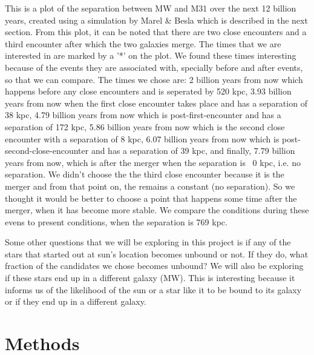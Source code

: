 \documentclass[iop]{emulateapj}
\begin{document}
    This is a plot of the separation between MW and M31 over the next 12 billion years, created using a simulation by Marel & Besla \cite{marel} which is described in the next section. From this plot, it can be noted that there are two close encounters and a third encounter after which the two galaxies merge. The times that we are interested in are marked by a '*' on the plot. We found these times interesting because of the events they are associated with, specially before and after events, so that we can compare. The times we chose are: 2 billion years from now which happens before any close encounters and is seperated by 520 kpc, 3.93 billion years from now when the first close encounter takes place and has a separation of 38 kpc, 4.79 billion years from now which is post-first-encounter and has a separation of 172 kpc, 5.86 billion years from now which is the second close encounter with a separation of 8 kpc, 6.07 billion years from now which is post-second-close-encounter and has a separation of 39 kpc, and finally, 7.79 billion years from now, which is after the merger when the separation is ~0 kpc, i.e. no separation. We didn't choose the the third close encounter because it is the merger and from that point on, the remains a constant (no separation). So we thought it would be better to choose a point that happens some time after the merger, when it has become more stable. We compare the conditions during these evens to present conditions, when the separation is 769 kpc. \medskip
    
    Some other questions that we will be exploring in this project is if any of the stars that started out at sun's location becomes unbound or not. If they do, what fraction of the candidates we chose becomes unbound? We will also be exploring if these stars end up in a different galaxy (MW). This is interesting because it informs us of the likelihood of the sun or a star like it to be bound to its galaxy or if they end up in a different galaxy. 

\section{Methods}

    
\end{document}
